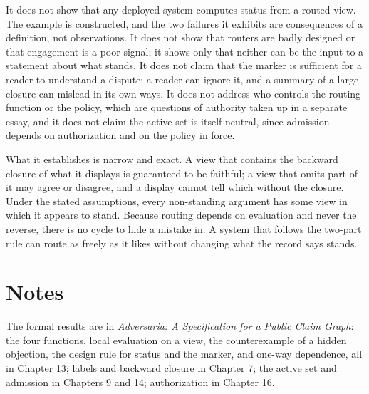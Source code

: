 \documentclass[11pt]{article}
\begin{document}
It does not show that any deployed system computes status from a routed view. The example is constructed, and the two failures it exhibits are consequences of a definition, not observations. It does not show that routers are badly designed or that engagement is a poor signal; it shows only that neither can be the input to a statement about what stands. It does not claim that the marker is sufficient for a reader to understand a dispute: a reader can ignore it, and a summary of a large closure can mislead in its own ways. It does not address who controls the routing function or the policy, which are questions of authority taken up in a separate essay, and it does not claim the active set is itself neutral, since admission depends on authorization and on the policy in force.

What it establishes is narrow and exact. A view that contains the backward closure of what it displays is
guaranteed to be faithful; a view that omits part of it may agree or
disagree, and a display cannot tell which without the closure. Under the
stated assumptions, every non-standing argument has some view in which it
appears to stand. Because routing depends on evaluation and never the reverse, there is no cycle to hide a mistake in. A system that follows the two-part rule can route as freely as it likes without changing what the record says stands.

\section*{Notes}

The formal results are in \emph{Adversaria: A Specification for a Public Claim Graph}: the four functions, local evaluation on a view, the counterexample of a hidden objection, the design rule for status and the marker, and one-way dependence, all in Chapter 13; labels and backward closure in Chapter 7; the active set and admission in Chapters 9 and 14; authorization in Chapter 16.
\end{document}
